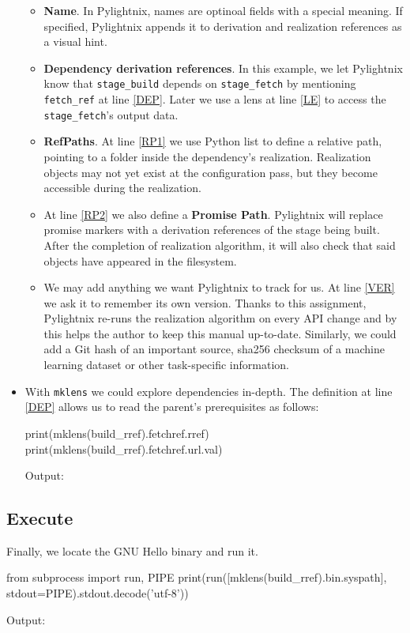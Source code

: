 \begin{itemize}
    \begin{itemize}

      \item \textbf{Name}. In Pylightnix, names are optinoal fields with a special
        meaning. If specified, Pylightnix appends it to derivation and
        realization references as a visual hint.

      \item \textbf{Dependency derivation references}. In this example, we let
        Pylightnix know that \texttt{stage\_build} depends on
        \texttt{stage\_fetch} by mentioning \texttt{fetch\_ref} at line
        \ref{DEP}. Later we use a lens at line \ref{LE} to access the
        \texttt{stage\_fetch}'s output data.

      \item \textbf{RefPaths}. At line \ref{RP1} we use Python list to define a
        relative path, pointing to a folder inside the dependency's realization.
        Realization objects may not yet exist at the configuration pass, but
        they become accessible during the realization.

      \item At line \ref{RP2} we also define a \textbf{Promise Path}. Pylightnix
        will replace promise markers with a derivation references of the stage
        being built. After the completion of realization algorithm, it will also
        check that said objects have appeared in the filesystem.

      \item We may add anything we want Pylightnix to track for us. At line
        \ref{VER} we ask it to remember its own version. Thanks to this
        assignment, Pylightnix re-runs the realization algorithm on every API
        change and by this helps the author to keep this manual up-to-date.
        Similarly, we could add a Git hash of an important source, sha256
        checksum of a machine learning dataset or other task-specific
        information.

    \end{itemize}

  \item With \texttt{mklens} we could explore dependencies in-depth. The
    definition at line \ref{DEP} allows us to read the parent's prerequisites as
    follows:

    \begin{pythontexcode}
    print(mklens(build_rref).fetchref.rref)
    print(mklens(build_rref).fetchref.url.val)
    \end{pythontexcode}

    Output:

    \mysmallstdout

\end{itemize}

\pagebreak
\subsection{Execute}

Finally, we locate the GNU Hello binary and run it.

\begin{pythontexcode}
from subprocess import run, PIPE
print(run([mklens(build_rref).bin.syspath], stdout=PIPE).stdout.decode('utf-8'))
\end{pythontexcode}

Output:

\mystdout



